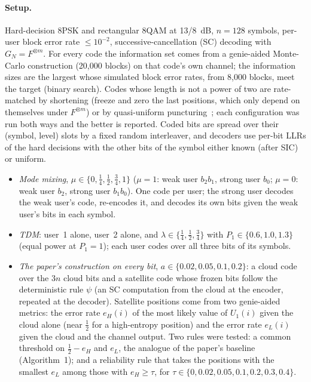 \documentclass[11pt]{article}
\begin{document}
\paragraph{Setup.} Hard-decision 8PSK and rectangular 8QAM at 13/8~dB, $n=128$ symbols, per-user block error rate $\le10^{-2}$, successive-cancellation (SC) decoding with $G_N=F^{\otimes m}$. For every code the information set comes from a genie-aided Monte-Carlo construction (20{,}000 blocks) on that code's own channel; the information sizes are the largest whose simulated block error rates, from 8{,}000 blocks, meet the target (binary search). Codes whose length is not a power of two are rate-matched by shortening (freeze and zero the last positions, which only depend on themselves under $F^{\otimes m}$) or by quasi-uniform puncturing~\cite{bioglio2021}; each configuration was run both ways and the better is reported. Coded bits are spread over their (symbol, level) slots by a fixed random interleaver, and decoders use per-bit LLRs of the hard decisions with the other bits of the symbol either known (after SIC) or uniform.
\begin{itemize}
\item \emph{Mode mixing}, $\mu\in\{0,\frac14,\frac12,\frac34,1\}$ ($\mu=1$: weak user $b_2b_1$, strong user $b_0$; $\mu=0$: weak user $b_2$, strong user $b_1b_0$). One code per user; the strong user decodes the weak user's code, re-encodes it, and decodes its own bits given the weak user's bits in each symbol.
\item \emph{TDM}: user~1 alone, user~2 alone, and $\lambda\in\{\frac14,\frac12,\frac34\}$ with $P_1\in\{0.6,1.0,1.3\}$ (equal power at $P_1=1$); each user codes over all three bits of its symbols.
\item \emph{The paper's construction on every bit}, $a\in\{0.02,0.05,0.1,0.2\}$: a cloud code over the $3n$ cloud bits and a satellite code whose frozen bits follow the deterministic rule $\psi$ (an SC computation from the cloud at the encoder, repeated at the decoder). Satellite positions come from two genie-aided metrics: the error rate $e_H(i)$ of the most likely value of $U_1(i)$ given the cloud alone (near $\frac12$ for a high-entropy position) and the error rate $e_L(i)$ given the cloud and the channel output. Two rules were tested: a common threshold on $\frac12-e_H$ and $e_L$, the analogue of the paper's baseline (Algorithm~1); and a reliability rule that takes the positions with the smallest $e_L$ among those with $e_H\ge\tau$, for $\tau\in\{0,0.02,0.05,0.1,0.2,0.3,0.4\}$.
\end{itemize}
\end{document}
